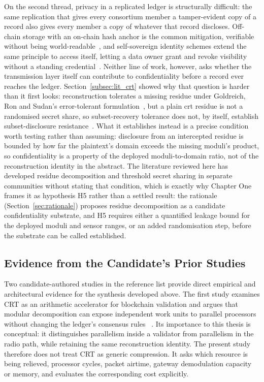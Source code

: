 \documentclass[12pt,a4paper,oneside]{book}
\begin{document}
On the second thread, privacy in a replicated ledger is structurally
difficult: the same replication that gives every consortium member a
tamper-evident copy of a record also gives every member a copy of whatever
that record discloses. Off-chain storage with an on-chain hash anchor is
the common mitigation, verifiable without being
world-readable~\cite{kim2023privacy}, and self-sovereign identity schemes
extend the same principle to access itself, letting a data owner grant and
revoke visibility without a standing
credential~\cite{amraouy2025ssi}. Neither line of work, however, asks
whether the transmission layer itself can contribute to confidentiality
before a record ever reaches the ledger. Section~\ref{subsec:lit_crt}
showed why that question is harder than it first looks: reconstruction
tolerates a missing residue under Goldreich, Ron and Sudan's
error-tolerant formulation~\cite{goldreich1999china}, but a plain
\gls{crt} residue is not a randomised secret share, so subset-recovery
tolerance does not, by itself, establish subset-disclosure
resistance~\cite{shoup2009computational}. What it establishes instead is
a precise condition worth testing rather than assuming: disclosure from
an intercepted residue is bounded by how far the plaintext's domain
exceeds the missing moduli's product, so confidentiality is a property of
the deployed moduli-to-domain ratio, not of the reconstruction identity
in the abstract. The literature reviewed here has developed residue
decomposition and threshold secret sharing in separate communities
without stating that condition, which is exactly why Chapter One frames
it as hypothesis H5 rather than a settled result: the rationale
(Section~\ref{sec:rationale}) proposes residue decomposition as a
candidate confidentiality substrate, and H5 requires either a quantified
leakage bound for the deployed moduli and sensor ranges, or an added
randomisation step, before the substrate can be called established.

\subsection{Evidence from the Candidate's Prior Studies}
\label{subsec:lit_candidate_studies}

Two candidate-authored studies in the reference list provide direct empirical
and architectural evidence for the synthesis developed above. The first study
examines CRT as an arithmetic accelerator for blockchain validation and argues
that modular decomposition can expose independent work units to parallel
processors without changing the ledger's consensus rules
~\cite{beloa2025bitcoincrt}. Its importance to this thesis is conceptual:
it distinguishes parallelism inside a validator from parallelism in the radio
path, while retaining the same reconstruction identity. The present study
therefore does not treat CRT as generic compression. It asks which resource is
being relieved, processor cycles, packet airtime, gateway demodulation capacity
or memory, and evaluates the corresponding cost explicitly.
\end{document}
